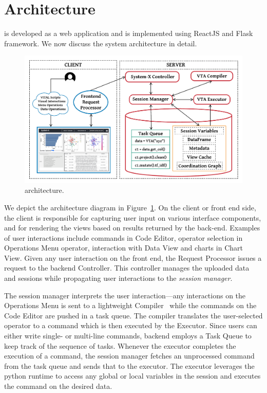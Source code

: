 \section{\system Architecture}
\system is developed as a web application and is implemented using ReactJS and Flask framework. We now discuss the system architecture in detail. 
\begin{figure}[!htb] 
  \centering
  \includegraphics[width=\linewidth]{figures/leam_arch.pdf}
  \caption{\small \system architecture. \label{fig:arch}} 
\end{figure}


We depict the architecture
diagram in Figure~\ref{fig:arch}.
On the client or front end side,
the \system client is responsible
for capturing user input 
on various interface components,
and for rendering the views
based on results returned by the
back-end. Examples of user interactions include
\vital commands in Code Editor, 
operator selection in Operations Menu operator,
interaction with Data View and charts in Chart View.
Given any user interaction
on the front end,
the \system Request Processor
issues a request to the backend \system Controller.
This controller manages the uploaded data and sessions
while propagating user interactions to the {\em session
manager}. 

The session manager interprets the user 
interaction---any interactions on the Operations Menu
is sent to a lightweight \vta Compiler~\cite{rahman2020leam}
while the \vital commands on the Code Editor are pushed in a task queue.
The \vta compiler translates the user-selected operator to a \vital
command which is then executed by the \vta Executor. 
Since users can either write single- or multi-line \vital commands,
\system backend employs a Task Queue to keep track of the sequence of
tasks. Whenever the \vta executor completes the execution of a \vital command, the session 
manager fetches an unprocessed command from the task queue and sends that to the
executor. The \vta executor leverages the python runtime to access any global or local variables in the session and executes the command on the desired data.

